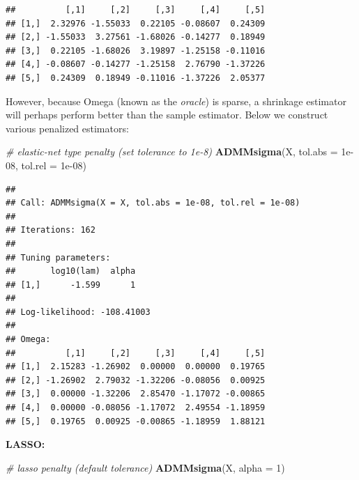 \documentclass[11pt,]{book}
\newenvironment{Shaded}{\begin{snugshade}}{\end{snugshade}}
\newcommand{\CommentTok}[1]{\textcolor[rgb]{0.56,0.35,0.01}{\textit{#1}}}
\newcommand{\DataTypeTok}[1]{\textcolor[rgb]{0.13,0.29,0.53}{#1}}
\newcommand{\DecValTok}[1]{\textcolor[rgb]{0.00,0.00,0.81}{#1}}
\newcommand{\FloatTok}[1]{\textcolor[rgb]{0.00,0.00,0.81}{#1}}
\newcommand{\KeywordTok}[1]{\textcolor[rgb]{0.13,0.29,0.53}{\textbf{#1}}}
\newcommand{\NormalTok}[1]{#1}
\theoremstyle{definition}
\theoremstyle{definition}
\theoremstyle{definition}
\theoremstyle{remark}
\begin{document}
\begin{verbatim}
##          [,1]     [,2]     [,3]     [,4]     [,5]
## [1,]  2.32976 -1.55033  0.22105 -0.08607  0.24309
## [2,] -1.55033  3.27561 -1.68026 -0.14277  0.18949
## [3,]  0.22105 -1.68026  3.19897 -1.25158 -0.11016
## [4,] -0.08607 -0.14277 -1.25158  2.76790 -1.37226
## [5,]  0.24309  0.18949 -0.11016 -1.37226  2.05377
\end{verbatim}

\vspace{0.5cm}

However, because Omega (known as the \emph{oracle}) is sparse, a
shrinkage estimator will perhaps perform better than the sample
estimator. Below we construct various penalized estimators:

\vspace{0.5cm}

\begin{Shaded}
\begin{Highlighting}[]
\CommentTok{# elastic-net type penalty (set tolerance to 1e-8)}
\KeywordTok{ADMMsigma}\NormalTok{(X, }\DataTypeTok{tol.abs =} \FloatTok{1e-08}\NormalTok{, }\DataTypeTok{tol.rel =} \FloatTok{1e-08}\NormalTok{)}
\end{Highlighting}
\end{Shaded}

\begin{verbatim}
## 
## Call: ADMMsigma(X = X, tol.abs = 1e-08, tol.rel = 1e-08)
## 
## Iterations: 162
## 
## Tuning parameters:
##       log10(lam)  alpha
## [1,]      -1.599      1
## 
## Log-likelihood: -108.41003
## 
## Omega:
##          [,1]     [,2]     [,3]     [,4]     [,5]
## [1,]  2.15283 -1.26902  0.00000  0.00000  0.19765
## [2,] -1.26902  2.79032 -1.32206 -0.08056  0.00925
## [3,]  0.00000 -1.32206  2.85470 -1.17072 -0.00865
## [4,]  0.00000 -0.08056 -1.17072  2.49554 -1.18959
## [5,]  0.19765  0.00925 -0.00865 -1.18959  1.88121
\end{verbatim}

\vspace{0.5cm}

\textbf{LASSO:}

\vspace{0.5cm}

\begin{Shaded}
\begin{Highlighting}[]
\CommentTok{# lasso penalty (default tolerance)}
\KeywordTok{ADMMsigma}\NormalTok{(X, }\DataTypeTok{alpha =} \DecValTok{1}\NormalTok{)}
\end{Highlighting}
\end{Shaded}
\end{document}
